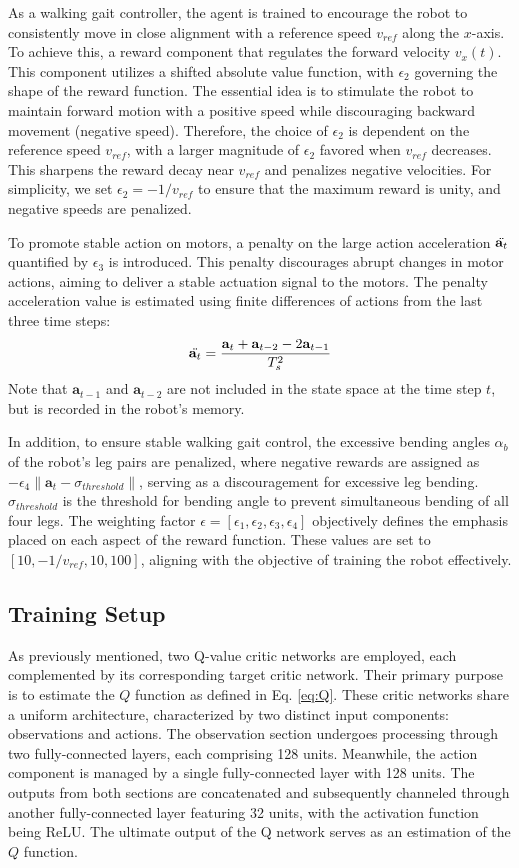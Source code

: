 As a walking gait controller, the agent is trained to encourage the robot to consistently move in close alignment with a reference speed $v_{ref}$ along the $x$-axis. To achieve this, a reward component that regulates the forward velocity $v_x(t)$. This component utilizes a shifted absolute value function, with $\epsilon_2$ governing the shape of the reward function. The essential idea  is to stimulate the robot to maintain forward motion with a positive speed while discouraging backward movement (negative speed). Therefore, the choice of $\epsilon_2$ is dependent on the reference speed $v_{ref}$, with a larger magnitude of $\epsilon_2$ favored when $v_{ref}$ decreases. This sharpens the reward decay near $v_{ref}$ and penalizes negative velocities. For simplicity, we set $\epsilon_2 = −1/v_{ref}$ to ensure that the maximum reward is unity, and negative speeds are penalized. 

To promote stable action on motors, a penalty on the large action acceleration $\Ddot{\mathbf{a}_t}$ quantified by $\epsilon_3$ is introduced. This penalty discourages abrupt changes in motor actions, aiming to deliver a stable actuation signal to the motors. The penalty acceleration value is estimated using finite differences of actions from the last three time steps: $$\Ddot{\mathbf{a}_t} = \frac{\mathbf{a}_t+\mathbf{a}_{t-2}-2\mathbf{a}_{t-1}}{T_s^2}$$ Note that $\mathbf{a}_{t-1}$ and $\mathbf{a}_{t-2}$ are not included in the state space at the time step $t$, but is recorded in the robot's memory.

In addition, to ensure stable walking gait control, the excessive bending angles $\alpha_b$ of the robot's leg pairs are penalized, where negative rewards are assigned as $- \epsilon_4\lVert\mathbf{a}_t-\sigma_{threshold}\rVert$, serving as a discouragement for excessive leg bending. $\sigma_{threshold}$ is the threshold for bending angle to prevent simultaneous bending of all four legs. The weighting factor $\epsilon = [\epsilon_1, \epsilon_2, \epsilon_3, \epsilon_4]$ objectively defines the emphasis placed on each aspect of the reward function. These values are set to $[10, −1/v_{ref}, 10, 100]$, aligning with the objective of training the robot effectively.

\subsection{Training Setup}
As previously mentioned, two Q-value critic networks are employed, each complemented by its corresponding target critic network. Their primary purpose is to estimate the $Q$ function as defined in Eq. \ref{eq:Q}. These critic networks share a uniform architecture, characterized by two distinct input components: observations and actions. The observation section undergoes processing through two fully-connected layers, each comprising 128 units. Meanwhile, the action component is managed by a single fully-connected layer with 128 units. The outputs from both sections are concatenated and subsequently channeled through another fully-connected layer featuring 32 units, with the activation function being \ac{ReLU}. The ultimate output of the Q network serves as an estimation of the $Q$ function. 

